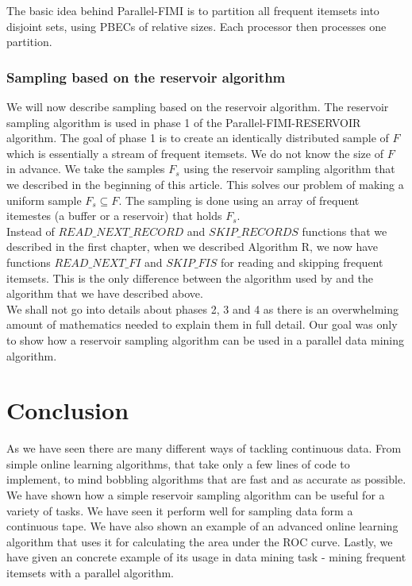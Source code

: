 \documentclass[journal]{IEEEtran/IEEEtran}
\begin{document}
The basic idea behind Parallel-FIMI is to partition all frequent itemsets into disjoint sets, using PBECs of relative sizes. Each processor then processes one partition.\\
\subsubsection*{Sampling based on the reservoir algorithm}
We will now describe sampling based on the reservoir algorithm. The reservoir sampling algorithm is used in phase 1 of the Parallel-FIMI-RESERVOIR algorithm. The goal of phase 1 is to create an identically distributed sample of $F$ which is essentially a stream of frequent itemsets. We do not know the size of $F$ in advance. We take the samples $F_s$ using the reservoir sampling algorithm that we described in the beginning of this article. This solves our problem of making a uniform sample $F_s \subseteq F$. The sampling is done using an array of frequent itemestes (a buffer or a reservoir) that holds $F_s$.\\

Instead of $READ\_NEXT\_RECORD$ and $SKIP\_RECORDS$ functions that we described in the first chapter, when we described Algorithm R, we now have functions $READ\_NEXT\_FI$ and $SKIP\_FIS$ for reading and skipping frequent itemsets. This is the only difference between the algorithm used by \cite{kessl} and the algorithm that we have described above.\\

We shall not go into details about phases 2, 3 and 4 as there is an overwhelming amount of mathematics needed to explain them in full detail. Our goal was only to show how a reservoir sampling algorithm can be used in a parallel data mining algorithm.
\section{Conclusion}
As we have seen there are many different ways of tackling continuous data. From simple online learning algorithms, that take only a few lines of code to implement, to mind bobbling algorithms that are fast and as accurate as possible. We have shown how a simple reservoir sampling algorithm can be useful for a variety of tasks. We have seen it perform well for sampling data form a continuous tape. We have also shown an example of an advanced online learning algorithm that uses it for calculating the area under the ROC curve. Lastly, we have given an concrete example of its usage in data mining task - mining frequent itemsets with a parallel algorithm.\\
\end{document}
